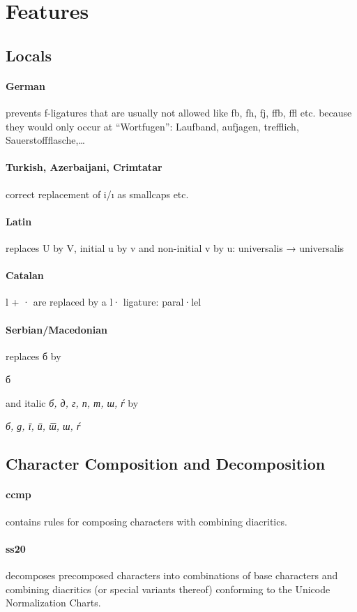 \documentclass[pagesize,DIV14]{scrartcl}
\begin{document}
\section{Features}
\subsection{Locals}
\paragraph*{German} prevents f-ligatures that are usually not allowed like fb, fh, fj, ffb, ffl etc. because they would only occur at \enquote{Wortfugen}: {Laufband, aufjagen, trefflich,  Sauerstoffflasche,…}
\paragraph*{Turkish, Azerbaijani, Crimtatar} correct replacement of i/ı as smallcaps etc.
\paragraph*{Latin} replaces U by V, initial u by v and non-initial v by u: universalis → { universalis}
\paragraph*{Catalan} l + · are replaced by a l· ligature: {paral·lel}
\paragraph*{Serbian/Macedonian} replaces б by \begin{serbian}б\end{serbian} and italic \textit{б, д, г, п, т, ш, ѓ} by \begin{serbian}\itshape б, д, г, п, т, ш, ѓ\end{serbian}

\subsection{Character Composition and Decomposition}
\paragraph*{ccmp} contains rules for composing characters with combining diacritics.
\paragraph*{ss20} decomposes precomposed characters into combinations of base characters and combining diacritics (or special variants thereof) conforming to the Unicode Normalization Charts.
\end{document}

